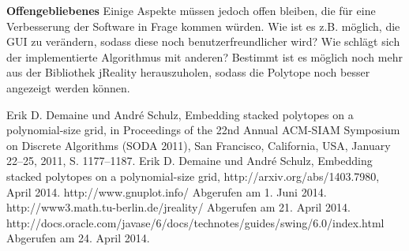 \textbf{Offengebliebenes} Einige Aspekte müssen jedoch offen bleiben, die für eine Verbesserung der Software in Frage kommen würden. Wie ist es z.B. möglich, die GUI zu verändern, sodass diese noch benutzerfreundlicher wird? Wie schlägt sich der implementierte Algorithmus mit anderen? Bestimmt ist es möglich noch mehr aus der Bibliothek jReality herauszuholen, sodass die Polytope noch besser angezeigt werden können.



\begin{thebibliography}{999}
 Erik D. Demaine und André Schulz, Embedding stacked polytopes on a polynomial-size grid, in Proceedings of the 22nd Annual ACM-SIAM Symposium on Discrete Algorithms (SODA 2011), San Francisco, California, USA, January 22–25, 2011, S. 1177–1187.
 Erik D. Demaine und André Schulz, Embedding stacked polytopes on a polynomial-size grid, http://arxiv.org/abs/1403.7980, April 2014.
 http://www.gnuplot.info/ Abgerufen am 1. Juni 2014.
 http://www3.math.tu-berlin.de/jreality/ Abgerufen am 21. April 2014.
 http://docs.oracle.com/javase/6/docs/technotes/guides/swing/6.0/index.html Abgerufen am 24. April 2014.
\end{thebibliography}